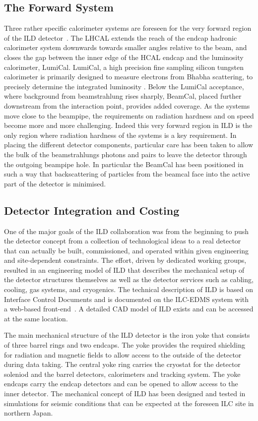 \documentclass[%
 amsmath,amssymb,
 aps,
]{revtex4-1}
\begin{document}
\subsection{The Forward System}
Three rather specific calorimeter systems are foreseen for the very forward region of the ILD detector~\cite{Abramowicz:2010bg}. The LHCAL extends the reach of the endcap hadronic calorimeter system downwards towards smaller angles relative to the beam, and closes the gap between the inner edge of the HCAL endcap and the luminosity calorimeter, LumiCal. LumiCal, a high precision fine sampling silicon tungsten calorimeter is primarily designed to measure electrons from Bhabha scattering, to precisely determine the integrated luminosity \cite{bib-luminosity}. Below the LumiCal acceptance, where background from beamstrahlung rises sharply, BeamCal, placed further downstream from the interaction point, provides added coverage. As the systems move close to the beampipe, the requirements on radiation hardness and on speed become more and more challenging. Indeed this very forward region in ILD is the only region where radiation hardness of the systems is a key requirement. In placing the different detector components, particular care has been taken to allow the bulk of the beamstrahlungs photons and pairs to leave the detector through the outgoing beampipe hole. In particular the BeamCal has been positioned in such a way that backscattering of particles from the beamcal face into the active part of the detector is minimised.

\subsection{Detector Integration and Costing}
One of the major goals of the ILD collaboration was from the beginning to push the detector concept from a collection of technological ideas to a real detector that can actually be built, commissioned, and operated within given engineering and site-dependent constraints. The effort, driven by dedicated working groups, resulted in an engineering model of ILD that describes the mechanical setup of the detector structures themselves as well as the detector services such as cabling, cooling, gas systems, and cryogenics. The technical description of ILD is based on Interface Control Documents and is documented on the ILC-EDMS system with a web-based front-end~\cite{EDMS}. A detailed CAD model of ILD exists and can be accessed at the same location.

The main mechanical structure of the ILD detector is the iron yoke that consists of three barrel rings and two endcaps. The yoke provides the required shielding for radiation and magnetic fields to allow access to the outside of the detector during data taking. The central yoke ring carries the cryostat for the detector soleniod and the barrel detectors, calorimeters and tracking system. The yoke endcaps carry the endcap detectors and can be opened to allow access to the inner detector. The mechanical concept of ILD has been designed and tested in simulations for seismic conditions that can be expected at the foreseen ILC site in northern Japan.
\end{document}
